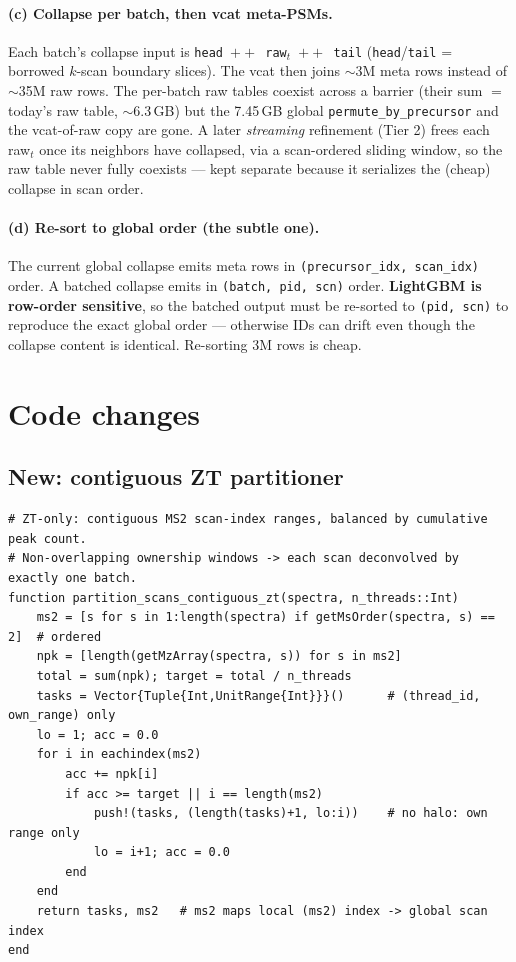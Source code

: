 \documentclass[11pt]{article}
\newcommand{\code}[1]{\texttt{\small #1}}
\begin{document}
\paragraph{(c) Collapse per batch, then vcat meta-PSMs.} Each batch's collapse input is
\code{head $++$ raw$_t$ $++$ tail} (\code{head}/\code{tail} = borrowed $k$-scan boundary
slices). The vcat then joins $\sim$3M meta rows instead of $\sim$35M raw rows. The per-batch
raw tables coexist across a barrier (their sum $=$ today's raw table, $\sim$6.3\,GB) but the
7.45\,GB global \code{permute\_by\_precursor} and the vcat-of-raw copy are gone. A later
\emph{streaming} refinement (Tier 2) frees each raw$_t$ once its neighbors have collapsed,
via a scan-ordered sliding window, so the raw table never fully coexists --- kept separate
because it serializes the (cheap) collapse in scan order.

\paragraph{(d) Re-sort to global order (the subtle one).} The current global collapse emits
meta rows in \code{(precursor\_idx, scan\_idx)} order. A batched collapse emits in
\code{(batch, pid, scn)} order. \textbf{LightGBM is row-order sensitive}, so the batched
output must be re-sorted to \code{(pid, scn)} to reproduce the exact global order --- otherwise
IDs can drift even though the collapse content is identical. Re-sorting 3M rows is cheap.

\section{Code changes}

\subsection{New: contiguous ZT partitioner}
\begin{lstlisting}
# ZT-only: contiguous MS2 scan-index ranges, balanced by cumulative peak count.
# Non-overlapping ownership windows -> each scan deconvolved by exactly one batch.
function partition_scans_contiguous_zt(spectra, n_threads::Int)
    ms2 = [s for s in 1:length(spectra) if getMsOrder(spectra, s) == 2]  # ordered
    npk = [length(getMzArray(spectra, s)) for s in ms2]
    total = sum(npk); target = total / n_threads
    tasks = Vector{Tuple{Int,UnitRange{Int}}}()      # (thread_id, own_range) only
    lo = 1; acc = 0.0
    for i in eachindex(ms2)
        acc += npk[i]
        if acc >= target || i == length(ms2)
            push!(tasks, (length(tasks)+1, lo:i))    # no halo: own range only
            lo = i+1; acc = 0.0
        end
    end
    return tasks, ms2   # ms2 maps local (ms2) index -> global scan index
end
\end{lstlisting}
\end{document}
